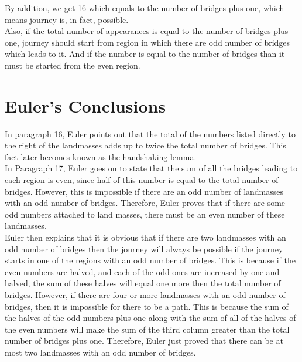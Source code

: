 \documentclass[acmsmall]{acmart}
\begin{document}
By addition, we get 16 which equals to the number of bridges plus one, which means
journey is, in fact, possible.\\

Also, if the total number of appearances is equal to the number of bridges plus one,
journey should start from region in which there are odd number of bridges which leads to
it. And if the number is equal to the number of bridges than it must be started from the
even region.\\


\section{Euler’s Conclusions}

In paragraph 16, Euler points out that the total of the numbers listed directly to the right of
the landmasses adds up to twice the total number of bridges. This fact later becomes
known as the handshaking lemma.\\

In Paragraph 17, Euler goes on to state that the sum of all the bridges leading to each
region is even, since half of this number is equal to the total number of bridges. However,
this is impossible if there are an odd number of landmasses with an odd number of
bridges. Therefore, Euler proves that if there are some odd numbers attached to land
masses, there must be an even number of these landmasses.\\

Euler then explains that it is obvious that if there are two landmasses with an odd number
of bridges then the journey will always be possible if the journey starts in one of the
regions with an odd number of bridges. This is because if the even numbers are halved,
and each of the odd ones are increased by one and halved, the sum of these halves will
equal one more then the total number of bridges. However, if there are four or more
landmasses with an odd number of bridges, then it is impossible for there to be a path.
This is because the sum of the halves of the odd numbers plus one along with the sum of
all of the halves of the even numbers will make the sum of the third column greater than
the total number of bridges plus one. Therefore, Euler just proved that there can be at
most two landmasses with an odd number of bridges.\\
\end{document}
